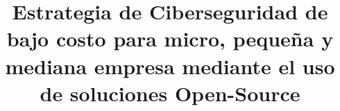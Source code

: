 \documentclass[stu, 12pt, letterpaper, donotrepeattitle, floatsintext, natbib]{apa7}
\title{\Large Estrategia de Ciberseguridad de bajo costo para micro, pequeña y mediana empresa mediante el uso de soluciones Open-Source}
\begin{document}
\maketitle


\renewcommand\contentsname{\largeÍndice}
\tableofcontents
\setcounter{tocdepth}{2}
\newpage
\renewcommand{\listfigurename}{\largeÍndice de fíguras}
\listoffigures
\newpage
\renewcommand{\listtablename}{\largeÍndice de tablas}
\listoftables
\newpage






\newpage
\renewcommand\refname{\large\textbf{Referencias}}

\end{document}
